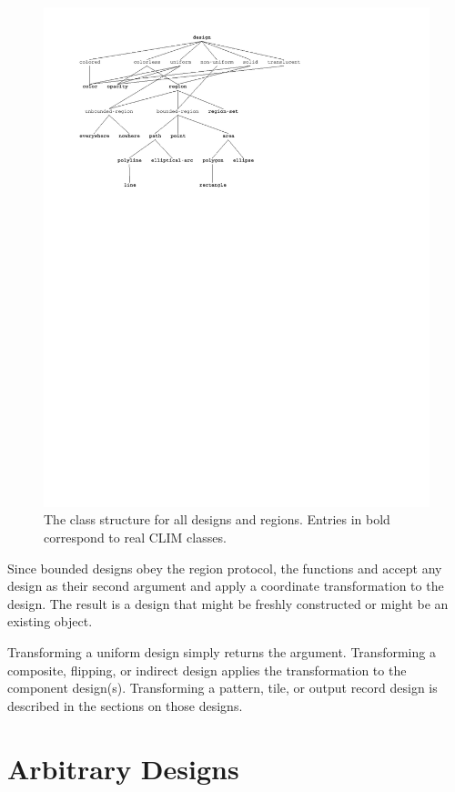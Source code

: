\begin{figure}
\centerline{\includegraphics{design-classes}}
\caption{\label{design-classes} The class structure for all designs and regions.
Entries in bold correspond to real CLIM classes.}
\end{figure}

Since bounded designs obey the region protocol, the functions
 and  accept any design as their
second argument and apply a coordinate transformation to the design.  The result
is a design that might be freshly constructed or might be an existing object.

Transforming a uniform design simply returns the argument.  Transforming a
composite, flipping, or indirect design applies the transformation to the
component design(s).  Transforming a pattern, tile, or output record design is
described in the sections on those designs.


\section {Arbitrary Designs}

